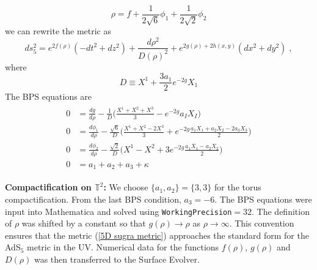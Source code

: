 \documentclass[11 pt]{article}
\begin{document}
\begin{equation}
    \rho = f + \frac{1}{2\sqrt{6}} \phi_1+ \frac{1}{2\sqrt{2}} \phi_2
\end{equation}
we can rewrite the metric as
\begin{equation} \label{5D sugra metric}
    ds_5^2=e^{2f(\rho)}(-dt^2+dz^2) + \frac{d\rho^2}{D(\rho)^2} + e^{2g(\rho)+2h(x,y)}(dx^2+dy^2)\; ,
\end{equation}
where
\begin{equation}
    D \equiv X^1 + \frac{3a_1}{2}e^{-2g} X_1
\end{equation}
The BPS equations are
\begin{align}
\begin{split}
       0 &= \frac{dg}{d\rho} - \frac1D \Big( \frac{X^1 + X^2 + X^3}3 - e^{-2g} a_I X_I \Big) \\
0 &= \frac{d\phi_1}{d\rho} - \frac{\sqrt6}D \Big( \frac{X^1 + X^2 - 2X^3}3 + e^{-2g} \frac{a_1X_1 + a_2X_2 - 2a_3X_3}2 \Big) \\
0 &= \frac{d\phi_2}{d\rho} - \frac{\sqrt2}D \Big( X^1 - X^2 + 3 e^{-2g} \frac{a_1X_1 - a_2X_2}2 \Big)\\
0 &= a_1 + a_2 + a_3 + \kappa
\end{split}
\end{align}

\bigskip
{\bf Compactification on $\mathbb{T}^2$:}
%
We choose $\{a_1,a_2\}=\{3,3\}$ for the torus compactification. From the last BPS condition, $a_3=-6$. The BPS equations were input into Mathematica and solved using \texttt{WorkingPrecision}$=32$. The definition of $\rho$ was shifted by a constant so that $g(\rho) \rightarrow \rho$ as $\rho\rightarrow\infty$. This convention ensures that the metric (\ref{5D sugra metric}) approaches the standard form for the AdS$_5$ metric in the UV. Numerical data for the functions $f(\rho)$, $g(\rho)$ and $D(\rho)$ was then transferred to the Surface Evolver.

\end{document}
